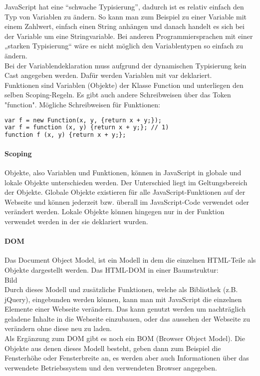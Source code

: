 JavaScript hat eine \enquote{schwache Typisierung}, dadurch ist es relativ einfach den Typ von Variablen zu ändern. So kann man zum Beispiel zu einer Variable mit einem  Zahlwert, einfach einen String anhängen und danach handelt es sich bei der Variable um eine Stringvariable. Bei anderen Programmiersprachen mit einer „starken Typisierung“ wäre es nicht möglich den Variablentypen so einfach zu ändern.\\
 Bei der Variablendeklaration muss aufgrund der dynamischen Typisierung kein Cast angegeben werden. Dafür werden Variablen mit var deklariert.\\
Funktionen sind Variablen (Objekte) der Klasse Function und unterliegen den selben Scoping-Regeln. Es gibt auch andere Schreibweisen über das Token "function". Mögliche Schreibweisen für Funktionen:\\
\begin{lstlisting}[language=html]
var f = new Function(x, y, {return x + y;});
var f = function (x, y) {return x + y;}; // 1)
function f (x, y) {return x + y;};
\end{lstlisting}

\paragraph{Scoping}
Objekte, also Variablen und Funktionen, können in JavaScript in globale und lokale Objekte unterschieden werden. Der Unterschied liegt im Geltungsbereich der Objekte. Globale Objekte existieren für alle JavaScript-Funktionen auf der Webseite und können jederzeit bzw. überall im JavaScript-Code verwendet oder verändert werden. Lokale Objekte können hingegen nur in der Funktion verwendet werden in der sie deklariert wurden.\\
\paragraph{DOM}
Das Document Object Model, ist ein Modell in dem die einzelnen HTML-Teile als Objekte dargestellt werden.
Das HTML-DOM in einer Baumstruktur:\\
 
Bild\\
Durch dieses Modell und zusätzliche Funktionen, welche als Bibliothek (z.B. jQuery), eingebunden werden können, kann man mit JavaScript die einzelnen Elemente einer Webseite verändern. Das kann genutzt werden um nachträglich geladene Inhalte in die Webseite einzubauen, oder das aussehen der Webseite zu verändern ohne diese neu zu laden.\\
Als Ergänzung zum DOM gibt es noch ein BOM (Browser Object Model). Die Objekte aus denen dieses Modell besteht, geben dann zum Beispiel die Fensterhöhe oder Fensterbreite an, es werden aber auch Informationen über das verwendete Betriebssystem und den verwendeten Browser angegeben.

